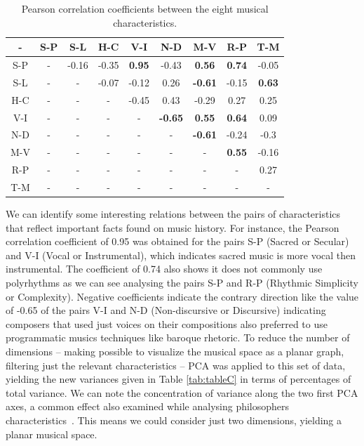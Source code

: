 \documentclass[
 aip,
 jmp,
 amsmath,amssymb,
 reprint,
]{revtex4-1}
\begin{document}
\begin{table}[ht]
\caption{\label{tab:tableB}Pearson correlation coefficients between
  the eight musical characteristics.}

\begin{ruledtabular}
\begin{tabular}{|c||c|c|c|c|c|c|c|c|}

-   &  S-P  &  S-L  &  H-C    &  V-I   &  N-D    &  M-V           &  R-P            &  T-M  \\ \hline
S-P & -     &  -0.16 &  -0.35 &  \textbf{0.95}  &  -0.43  &  \textbf{0.56}   &  \textbf{0.74}   &  -0.05 \\
S-L & -     &  -     &  -0.07 &  -0.12 &  0.26  &  \textbf{-0.61}  &  -0.15  &  \textbf{0.63} \\
H-C & -     &  -     &  -     &  -0.45 &  0.43  &  -0.29  &  0.27   &  0.25 \\
V-I & -     &  -     &  -     &  -     &  \textbf{-0.65} &  \textbf{0.55}   &  \textbf{0.64}   &  0.09 \\
N-D & -     &  -     &  -     &  -     &  -     &  \textbf{-0.61}  &  -0.24  &  -0.3 \\
M-V & -     &  -     &  -     &  -     &  -     &  -      &  \textbf{0.55}   &  -0.16 \\
R-P & -     &  -     &  -     &  -     &  -     &  -      &  -      &  0.27 \\
T-M & -     &  -     &  -     &  -     &  -     &  -      &  -      &  - \\

\end{tabular}
\end{ruledtabular}
\end{table}

We can identify some interesting relations between the pairs of
characteristics that reflect important facts found on music history. For
instance, the Pearson correlation coefficient of 0.95 was obtained for
the pairs S-P (Sacred or Secular) and V-I (Vocal or Instrumental), which indicates sacred music is more vocal then
instrumental. The coefficient of 0.74 also shows it does not commonly use polyrhythms as we can see
analysing the pairs S-P and R-P (Rhythmic Simplicity or Complexity).
Negative coefficients indicate the contrary direction like the
value of -0.65 of the pairs V-I and N-D (Non-discursive or Discursive) indicating composers that used
just voices on their compositions also preferred to use programmatic
musics techniques like baroque rhetoric.
To reduce the number of dimensions -- making possible to visualize the
musical space as a planar graph, filtering just the relevant
characteristics -- PCA was applied to this set of data, yielding the new variances given
in Table \ref{tab:tableC} in terms of percentages of total
variance. We can note the concentration of variance along the two
first PCA axes, a common effect also examined while analysing
philosophers characteristics~\cite{Fabbri}. This means we could
consider just two dimensions, yielding a planar
musical space.
\end{document}
